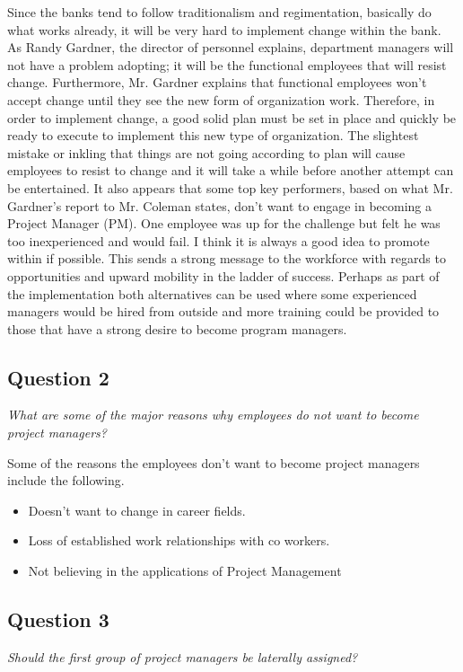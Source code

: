 \documentclass[letterpaper,10pt]{article}
\begin{document}
Since the banks tend to follow traditionalism and regimentation, basically do what works already, it will be very hard to implement change within the bank.  As Randy Gardner, the director of personnel explains, department managers will not have a problem adopting; it will be the functional employees that will resist change.  Furthermore, Mr. Gardner explains that functional employees won't accept change until they see the new form of organization work.  Therefore, in order to implement change, a good solid plan must be set in place and quickly be ready to execute to implement this new type of organization.  The slightest mistake or inkling that things are not going according to plan will cause employees to resist to change and it will take a while before another attempt can be entertained.  It also appears that some top key performers, based on what Mr. Gardner's report to Mr. Coleman states, don't want to engage in becoming a Project Manager (PM).  One employee was up for the challenge but felt he was too inexperienced and would fail.  I think it is always a good idea to promote within if possible.  This sends a strong message to the workforce with regards to opportunities and upward mobility in the ladder of success.  Perhaps as part of the implementation both alternatives can be used where some experienced managers would be hired from outside and more training could be provided to those that have a strong desire to become program managers.  

\subsection{Question 2}
\emph{What are some of the major reasons why employees do not want to become project managers?}\vspace*{1em}

Some of the reasons the employees don't want to become project managers include the following.
\begin{itemize}
\item Doesn't want to change in career fields.
\item Loss of established work relationships with co workers.
\item Not believing in the applications of Project Management
\end{itemize}

\subsection{Question 3}
\emph{Should the first group of project managers be laterally assigned?}\vspace*{1em}
\end{document}
